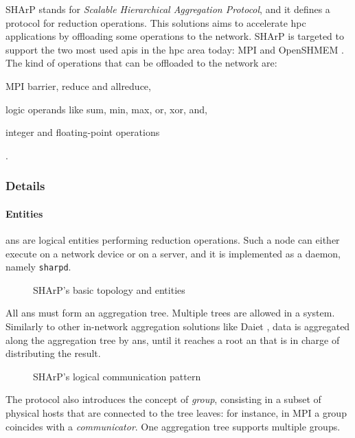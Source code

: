 SHArP \cite{sharp} stands for \textit{Scalable Hierarchical Aggregation Protocol}, and it defines a protocol for reduction operations.
This solutions aims to accelerate \gls{hpc} applications by offloading some operations to the network. SHArP \cite{sharp} is targeted to support the two most used \glspl{api} in the \gls{hpc} area today: MPI \cite{mpi} and OpenSHMEM \cite{openshmem}.
The kind of operations that can be offloaded to the network are:
\begin{mylist}
    \item MPI \cite{mpi} barrier, reduce and allreduce,
    \item logic operands like sum, min, max, or, xor, and,
    \item integer and floating-point operations
\end{mylist}.

\subsubsection{Details}
\paragraph{Entities}
\glspl{an} are logical entities performing reduction operations.
Such a node can either execute on a network device or on a server, and it is implemented as a daemon, namely \texttt{sharpd}.

\begin{figure}[!htb]
    \centering
    \usebox{\sharpbasic}
    \caption{SHArP's \texorpdfstring{\cite{sharp}}{} basic topology and entities}
\end{figure}

All \glspl{an} must form an aggregation tree.
Multiple trees are allowed in a system.
Similarly to other in-network aggregation solutions like Daiet \cite{daiet}, data is aggregated along the aggregation tree by \glspl{an}, until it reaches a root \gls{an} that is in charge of distributing the result.

\begin{figure}[!htb]
    \centering
    \usebox{\sharpcommunication}
    \caption{SHArP's \texorpdfstring{\cite{sharp}}{} logical communication pattern}
\end{figure}

The protocol also introduces the concept of \textit{group}, consisting in a subset of physical hosts that are connected to the tree leaves: for instance, in MPI \cite{mpi} a group coincides with a \textit{communicator}.
One aggregation tree supports multiple groups.

